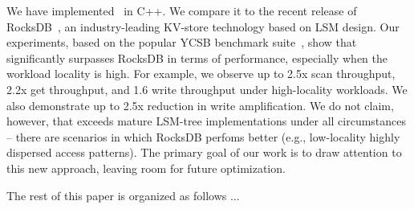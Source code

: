 We have implemented \sys\ in C++. We compare it to the recent release of RocksDB~\cite{rocks}, 
an industry-leading KV-store technology based on LSM design. Our experiments, based on the popular 
YCSB benchmark suite~\cite{YCSB}, show that \sys\/ significantly surpasses RocksDB in terms of performance, 
especially when the workload locality is high. For example, we observe up to 2.5x scan throughput, 2.2x
get throughput, and 1.6 write throughput under high-locality workloads. We also demonstrate up to 2.5x 
reduction in write amplification. We do not claim, however, that \sys\/ exceeds mature LSM-tree implementations 
under all circumstances -- there are scenarios in which RocksDB perfoms better (e.g., low-locality highly dispersed 
access patterns). The primary goal of our work is to draw attention to this new approach, leaving room for 
future optimization. 
 
The rest of this paper is organized as follows ... 



